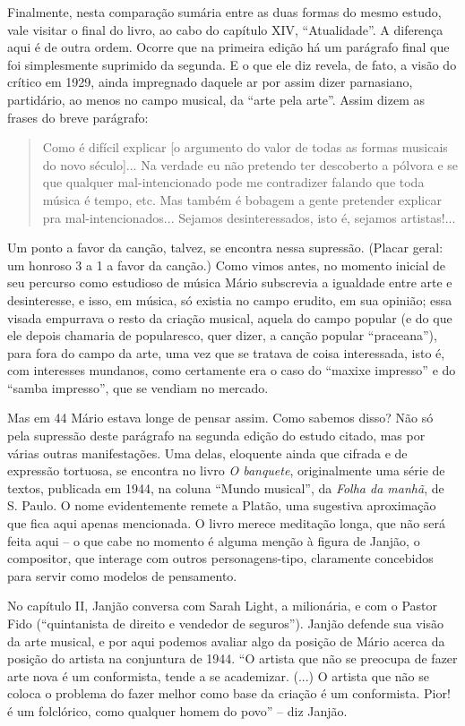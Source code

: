 Finalmente, nesta comparação sumária entre as duas formas do mesmo
estudo, vale visitar o final do livro, ao cabo do capítulo XIV,
``Atualidade''. A diferença aqui é de outra ordem. Ocorre que na
primeira edição há um parágrafo final que foi simplesmente suprimido da
segunda. E o que ele diz revela, de fato, a visão do crítico em 1929,
ainda impregnado daquele ar por assim dizer parnasiano, partidário, ao
menos no campo musical, da ``arte pela arte''. Assim dizem as frases do
breve parágrafo:

\begin{quote}
Como é difícil explicar {[}o argumento do valor de todas as formas
musicais do novo século{]}... Na verdade eu não pretendo ter descoberto
a pólvora e se que qualquer mal-intencionado pode me contradizer falando
que toda música é tempo, etc. Mas também é bobagem a gente pretender
explicar pra mal-intencionados... Sejamos desinteressados, isto é,
sejamos artistas!...
\end{quote}

Um ponto a favor da canção, talvez, se encontra nessa supressão. (Placar
geral: um honroso 3 a 1 a favor da canção.) Como vimos antes, no momento
inicial de seu percurso como estudioso de música Mário subscrevia a
igualdade entre arte e desinteresse, e isso, em música, só existia no
campo erudito, em sua opinião; essa visada empurrava o resto da criação
musical, aquela do campo popular (e do que ele depois chamaria de
popularesco, quer dizer, a canção popular ``praceana''), para fora do
campo da arte, uma vez que se tratava de coisa interessada, isto é, com
interesses mundanos, como certamente era o caso do ``maxixe impresso'' e
do ``samba impresso'', que se vendiam no mercado.

Mas em 44 Mário estava longe de pensar assim. Como sabemos disso? Não só
pela supressão deste parágrafo na segunda edição do estudo citado, mas
por várias outras manifestações. Uma delas, eloquente ainda que cifrada
e de expressão tortuosa, se encontra no livro \emph{O banquete},
originalmente uma série de textos, publicada em 1944, na coluna ``Mundo
musical'', da \emph{Folha da manhã}, de S. Paulo. O nome evidentemente
remete a Platão, uma sugestiva aproximação que fica aqui apenas
mencionada. O livro merece meditação longa, que não será feita aqui -- o
que cabe no momento é alguma menção à figura de Janjão, o compositor,
que interage com outros personagens-tipo, claramente concebidos para
servir como modelos de pensamento.

No capítulo II, Janjão conversa com Sarah Light, a milionária, e com o
Pastor Fido (``quintanista de direito e vendedor de seguros''). Janjão
defende sua visão da arte musical, e por aqui podemos avaliar algo da
posição de Mário acerca da posição do artista na conjuntura de 1944. ``O
artista que não se preocupa de fazer arte nova é um conformista, tende a
se academizar. (...) O artista que não se coloca o problema do fazer
melhor como base da criação é um conformista. Pior! é um folclórico,
como qualquer homem do povo'' -- diz Janjão.


